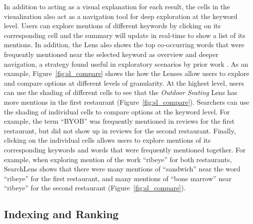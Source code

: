 In addition to acting as a visual explanation for each result, the cells in the visualization also act as a navigation tool for deep exploration at the keyword level. Users can explore mentions of different keywords by clicking on its corresponding cell and the summary will update in real-time to show a list of its mentions. In addition, the Lens also shows the top co-occurring words that were frequently mentioned near the selected keyword as overview and deeper navigation, a strategy found useful in exploratory scenarios by prior work \cite{di2018study,di2016rank,peltonen2017topic}. As an example, Figure~\ref{fig:sl_compare} shows the how the Lenses allow users to explore and compare options at different levels of granularity. At the highest level, users can use the shading of different cells to see that the \emph{Outdoor Seating} Lens has more mentions in the first restaurant (Figure~\ref{fig:sl_compare}). Searchers can use the shading of individual cells to compare options at the keyword level. For example, the term ``BYOB'' was frequently mentioned in reviews for the first restaurant, but did not show up in reviews for the second restaurant. Finally, clicking on the individual cells allows users to explore mentions of its corresponding keywords and words that were frequently mentioned together. For example, when exploring mention of the work ``ribeye'' for both restaurants, SearchLens shows that there were many mentions of ``sandwich'' near the word ``ribeye'' for the first restaurant, and many mentions of ``bone marrow'' near ``ribeye'' for the second restaurant (Figure~\ref{fig:sl_compare}).



\subsection{Indexing and Ranking}

